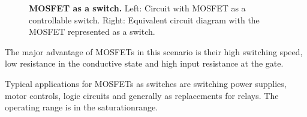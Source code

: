 {\begin{figure}[H]
    \caption{\textbf{MOSFET as a switch.} Left: Circuit with MOSFET as a controllable switch.
    Right: Equivalent circuit diagram with the MOSFET represented as a switch.}  
    \label{fig:MOSFETAlsSchalter}
\end{figure}

\begin{Key point}{}
The major advantage of MOSFETs in this scenario is their high switching speed, low resistance in the conductive state
and high input resistance at the gate.
\end{Key point}


Typical applications for MOSFETs as switches are switching power supplies, motor controls,
logic circuits and generally as replacements for relays. The operating range is in the
saturation\-range.}






